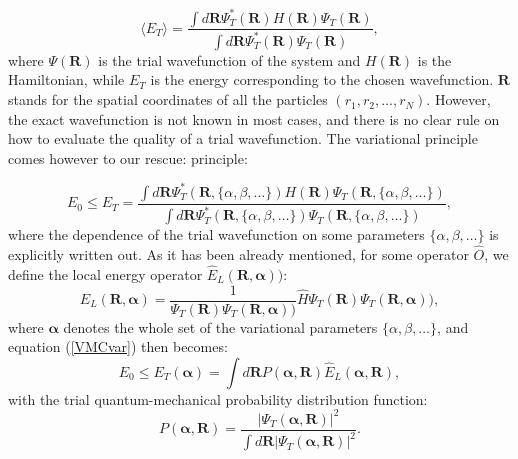 \documentclass[twoside,english]{uiofysmaster}
\begin{document}
\begin{equation}\label{eq:energyinqm}
\langle E_T \rangle = \frac{\int d\boldsymbol{R}\Psi_T^{\ast}(\boldsymbol{R})H(\boldsymbol{R})\Psi_T(\boldsymbol{R})}
{\int d\boldsymbol{R}\Psi_T^{\ast}(\boldsymbol{R})\Psi_T(\boldsymbol{R})},
\end{equation}
where $\Psi(\boldsymbol{R})$ is the trial wavefunction of the system
and $H(\boldsymbol{R})$ is the Hamiltonian, while $E_T$ is the energy
corresponding to the chosen wavefunction. $\boldsymbol{R}$ stands for
the spatial coordinates of all the particles $(r_1, r_2, \dots,
r_N)$. However, the exact wavefunction is not known in most cases, and
there is no clear rule on how to evaluate the quality of a trial
wavefunction. The variational principle comes however to our rescue:
principle:

\begin{equation}\label{VMCvar}
E_0 \leq E_T  =  \frac{\int d\boldsymbol{R}\Psi_T^{\ast}(\boldsymbol{R},\{\alpha, \beta, \dots\})H(\boldsymbol{R})\Psi_T(\boldsymbol{R},\{\alpha, \beta, \dots\})}
{\int d\boldsymbol{R}\Psi_T^{\ast}(\boldsymbol{R},\{\alpha, \beta, \dots\})\Psi_T(\boldsymbol{R},\{\alpha, \beta, \dots\})},
\end{equation}
where the dependence of the trial wavefunction on some parameters
$\{\alpha, \beta, \dots\}$ is explicitly written out.  As it has been
already mentioned, for some operator $\hat{O}$, we define the local
energy operator $\hat{E}_L(\boldsymbol{R},\boldsymbol{\alpha}))$:
\begin{equation}
\hat{E}_L(\boldsymbol{R},\boldsymbol{\alpha}) = \frac{1}{\Psi_T(\boldsymbol{R})\Psi_T(\boldsymbol{R},\boldsymbol{\alpha}))}\hat{H}\Psi_T(\boldsymbol{R})\Psi_T(\boldsymbol{R},\boldsymbol{\alpha})),
\end{equation}
where $\boldsymbol{\alpha}$ denotes the whole set of the variational
parameters $\{\alpha, \beta, \dots\}$, and equation (\ref{VMCvar})
then becomes:
\begin{equation}\label{inttoeval}
E_0 \leq E_T(\boldsymbol{\alpha})  = \int d \boldsymbol{R} P(\boldsymbol{\alpha},\boldsymbol{R})  \hat{E}_L(\boldsymbol{\alpha},\boldsymbol{R}),
\end{equation}
with the trial quantum-mechanical probability distribution function:
\begin{equation}
P(\boldsymbol{\alpha},\boldsymbol{R}) = \frac{|\Psi_T(\boldsymbol{\alpha},\boldsymbol{R})|^2}{\int d\boldsymbol{R} |\Psi_T(\boldsymbol{\alpha},\boldsymbol{R})|^2}.
\end{equation}
\end{document}

